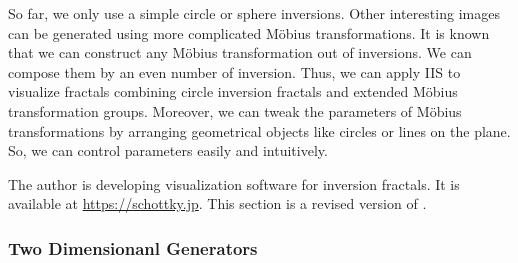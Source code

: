 So far, we only use a simple circle or sphere inversions.
Other interesting images can be generated using more
complicated M\"obius transformations.
It is known that we can construct any M\"obius transformation out of
inversions. We can compose them by an even number of inversion.
Thus, we can apply IIS to visualize fractals combining circle inversion
fractals and extended M\"obius transformation groups.
Moreover, we can tweak the parameters of M\"obius transformations by
arranging geometrical objects like circles or lines on the plane.
So, we can control parameters easily and intuitively.

The author is developing visualization software for inversion fractals.
It is available at \url{https://schottky.jp}.
This section is a revised version of \cite{bridges2017:159}.

\subsubsection{Two Dimensionanl Generators}

